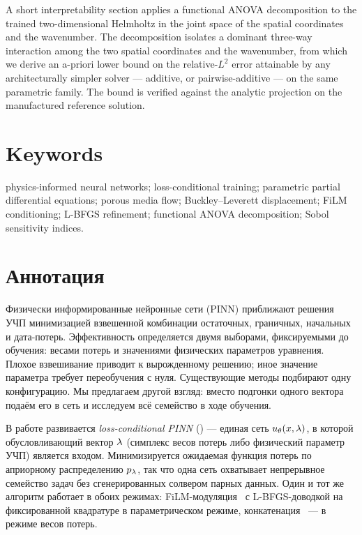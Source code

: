 \documentclass[12pt,a4paper]{extarticle}
\begin{document}
A short interpretability section applies a functional ANOVA decomposition to the trained two-dimensional Helmholtz \LCPINN{} in the joint space of the spatial coordinates and the wavenumber. The decomposition isolates a dominant three-way interaction among the two spatial coordinates and the wavenumber, from which we derive an a-priori lower bound on the relative-$L^2$ error attainable by any architecturally simpler solver --- additive, or pairwise-additive --- on the same parametric family. The bound is verified against the analytic projection on the manufactured reference solution.

\section*{Keywords}

physics-informed neural networks; loss-conditional training; parametric partial differential equations; porous media flow; Buckley--Leverett displacement; FiLM conditioning; L-BFGS refinement; functional ANOVA decomposition; Sobol sensitivity indices.

\newpage

\section*{Аннотация}


Физически информированные нейронные сети (PINN) приближают решения УЧП минимизацией взвешенной комбинации остаточных, граничных, начальных и дата-потерь. Эффективность определяется двумя выборами, фиксируемыми до обучения: весами потерь и значениями физических параметров уравнения. Плохое взвешивание приводит к вырожденному решению; иное значение параметра требует переобучения с нуля. Существующие методы подбирают одну конфигурацию. Мы предлагаем другой взгляд: вместо подгонки одного вектора подаём его в сеть и исследуем всё семейство в ходе обучения.

В работе развивается \emph{loss-conditional PINN} (\LCPINN{}) --- единая сеть $u_\theta(x, \lambda)$, в которой обусловливающий вектор $\lambda$ (симплекс весов потерь либо физический параметр УЧП) является входом. Минимизируется ожидаемая функция потерь по априорному распределению $p_\lambda$, так что одна сеть охватывает непрерывное семейство задач без сгенерированных солвером парных данных. Один и тот же алгоритм работает в обоих режимах: FiLM-модуляция~\cite{perez2018film} с L-BFGS-доводкой на фиксированной квадратуре в параметрическом режиме, конкатенация~\cite{dosovitskiy2020} --- в режиме весов потерь.
\end{document}
